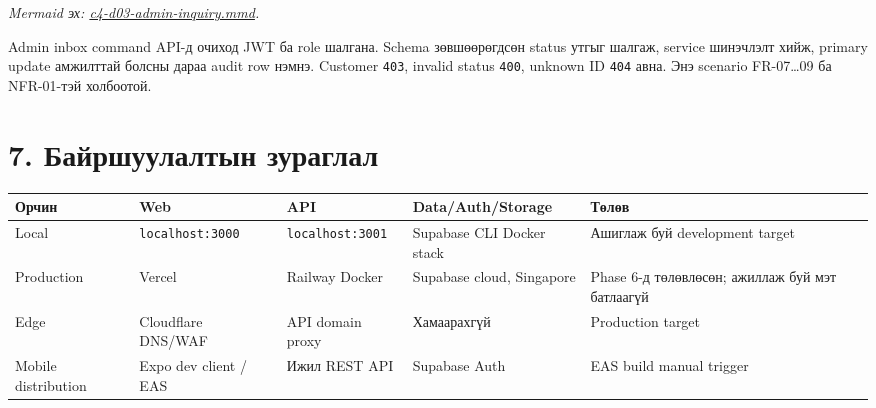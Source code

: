 \documentclass[
  mongolian,
]{article}
\begin{document}
\emph{Mermaid эх:
\href{https://github.com/Tengis01/Nogoolin/blob/main/docs/ICSI438/sem4/diagrams/c4-d03-admin-inquiry.mmd}{c4-d03-admin-inquiry.mmd}.}

Admin inbox command API-д очиход JWT ба role шалгана. Schema
зөвшөөрөгдсөн status утгыг шалгаж, service шинэчлэлт хийж, primary
update амжилттай болсны дараа audit row нэмнэ. Customer \texttt{403},
invalid status \texttt{400}, unknown ID \texttt{404} авна. Энэ scenario
FR-07\ldots09 ба NFR-01-тэй холбоотой.

\section{7. Байршуулалтын
зураглал}\label{ux431ux430ux439ux440ux448ux443ux443ux43bux430ux43bux442ux44bux43d-ux437ux443ux440ux430ux433ux43bux430ux43b}

\begin{longtable}[]{@{}
  >{\raggedright\arraybackslash}p{}
  >{\raggedright\arraybackslash}p{}
  >{\raggedright\arraybackslash}p{}
  >{\raggedright\arraybackslash}p{}
  >{\raggedright\arraybackslash}p{}@{}}
\toprule\noalign{}
\begin{minipage}[b]{\linewidth}\raggedright
Орчин
\end{minipage} & \begin{minipage}[b]{\linewidth}\raggedright
Web
\end{minipage} & \begin{minipage}[b]{\linewidth}\raggedright
API
\end{minipage} & \begin{minipage}[b]{\linewidth}\raggedright
Data/Auth/Storage
\end{minipage} & \begin{minipage}[b]{\linewidth}\raggedright
Төлөв
\end{minipage} \\
\midrule\noalign{}
\endhead
\bottomrule\noalign{}
\endlastfoot
Local & \texttt{localhost:3000} & \texttt{localhost:3001} & Supabase CLI
Docker stack & Ашиглаж буй development target \\
Production & Vercel & Railway Docker & Supabase cloud, Singapore & Phase
6-д төлөвлөсөн; ажиллаж буй мэт батлаагүй \\
Edge & Cloudflare DNS/WAF & API domain proxy & Хамаарахгүй & Production
target \\
Mobile distribution & Expo dev client / EAS & Ижил REST API & Supabase
Auth & EAS build manual trigger \\
\end{longtable}
\end{document}
